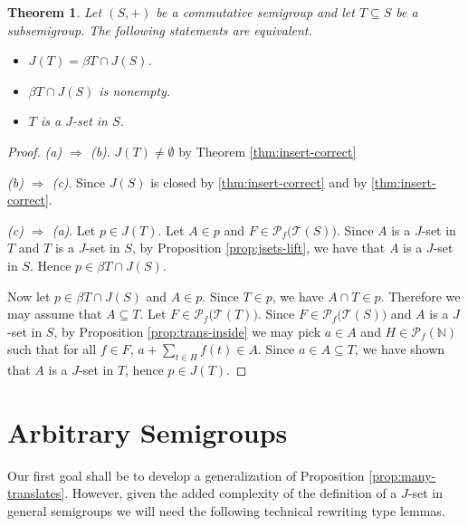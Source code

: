 \documentclass[12pt]{article}
\theoremstyle{plain}
\newtheorem{thm}{Theorem}[section]
\theoremstyle{definition}
\newcommand{\bbN}{\mathbb{N}}
\newcommand{\calT}{\mathcal{T}}
\newcommand{\Pf}{\mathcal{P}_f}
\begin{document}
\begin{thm}
  Let $(S, +)$ be a commutative semigroup and let $T \subseteq S$ be a
  subsemigroup.
  The following statements are equivalent. 
  \begin{itemize}
    \item[(a)] $J(T) = \beta T \cap J(S)$.
    \item[(b)] $\beta T \cap J(S)$ is nonempty.
    \item[(c)] $T$ is a $J$-set in $S$.
  \end{itemize}
\end{thm}
\begin{proof}
  \textsl{(a) $\Rightarrow$ (b)}.
  $J(T) \ne \emptyset$ by Theorem \ref{thm:insert-correct}

  \textsl{(b) $\Rightarrow$ (c)}.
  Since $J(S)$ is closed by \ref{thm:insert-correct} and by \ref{thm:insert-correct}. 

  \textsl{(c) $\Rightarrow$ (a)}.
  Let $p \in J(T)$.
  Let $A \in p$ and $F \in \Pf\bigl(\calT(S)\bigr)$.
  Since $A$ is a $J$-set in $T$ and $T$ is a $J$-set in $S$, by 
  Proposition \ref{prop:jsets-lift}, we have that $A$ is a $J$-set in $S$. 
  Hence $p \in \beta T \cap J(S)$.


  Now let $p \in \beta T \cap J(S)$ and $A \in p$. 
  Since $T \in p$, we have $A \cap T \in p$.
  Therefore we may assume that $A \subseteq T$.
  Let $F \in \Pf\bigl(\calT(T)\bigr)$.
  Since $F \in \Pf\bigl(\calT(S)\bigr)$ and $A$ is a $J$-set in $S$,
  by Proposition \ref{prop:trans-inside} we may pick $a \in A$ and $H \in \Pf(\bbN)$
  such that for all $f \in F$, $a + \sum_{t \in H} f(t) \in A$. 
  Since $a \in A \subseteq T$, we have shown that $A$ is a $J$-set in
  $T$, hence $p \in J(T)$. 
\end{proof}

\section{Arbitrary Semigroups}
Our first goal shall be to develop a generalization of
Proposition \ref{prop:many-translates}. 
However, given the added complexity of the definition of a $J$-set in general semigroups we will need the following technical rewriting type  lemmas.
\end{document}
